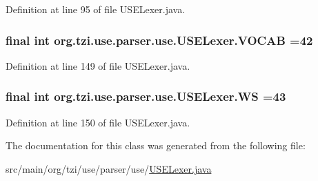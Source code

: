 Definition at line 95 of file U\-S\-E\-Lexer.\-java.

\hypertarget{classorg_1_1tzi_1_1use_1_1parser_1_1use_1_1_u_s_e_lexer_a08521a6702b70a9fba839e9b87775411}{
\subsubsection[{V\-O\-C\-A\-B}]{\setlength{\rightskip}{0pt plus 5cm}final int org.\-tzi.\-use.\-parser.\-use.\-U\-S\-E\-Lexer.\-V\-O\-C\-A\-B =42\hspace{0.3cm}{\ttfamily [static]}}}\label{classorg_1_1tzi_1_1use_1_1parser_1_1use_1_1_u_s_e_lexer_a08521a6702b70a9fba839e9b87775411}


Definition at line 149 of file U\-S\-E\-Lexer.\-java.

\hypertarget{classorg_1_1tzi_1_1use_1_1parser_1_1use_1_1_u_s_e_lexer_a60e553efb46d6acb348cd948ba75bf1f}{
\subsubsection[{W\-S}]{\setlength{\rightskip}{0pt plus 5cm}final int org.\-tzi.\-use.\-parser.\-use.\-U\-S\-E\-Lexer.\-W\-S =43\hspace{0.3cm}{\ttfamily [static]}}}\label{classorg_1_1tzi_1_1use_1_1parser_1_1use_1_1_u_s_e_lexer_a60e553efb46d6acb348cd948ba75bf1f}


Definition at line 150 of file U\-S\-E\-Lexer.\-java.



The documentation for this class was generated from the following file\-:\begin{DoxyCompactItemize}
\item 
src/main/org/tzi/use/parser/use/\hyperlink{_u_s_e_lexer_8java}{U\-S\-E\-Lexer.\-java}\end{DoxyCompactItemize}

